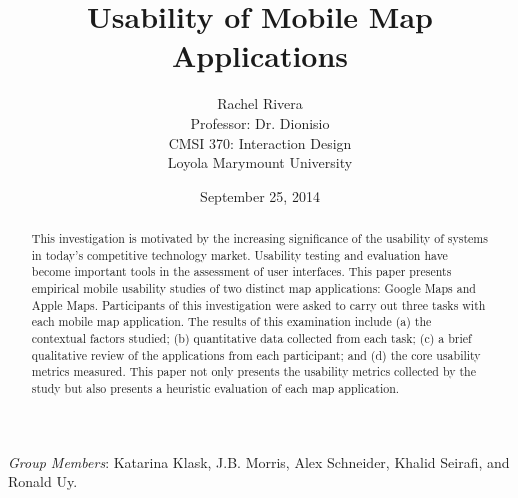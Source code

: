 \documentclass[a4paper; 11pt]{article}
\begin{document}
\title{Usability of Mobile Map Applications}

\author{Rachel Rivera\\
Professor: Dr. Dionisio\\
CMSI 370: Interaction Design\\
  Loyola Marymount University}

\date{September 25, 2014}


\renewcommand{\thefootnote}{\fnsymbol{footnote}}




\maketitle

\vspace{-.2in}
\begin{center}
\begin{abstract}
\noindent This investigation is motivated by the increasing significance of the usability of systems in today's competitive technology market. Usability testing and evaluation have become important tools in the assessment of user interfaces. This paper presents empirical mobile usability studies of two distinct map applications: Google Maps and Apple Maps. Participants of this investigation were asked to carry out three tasks with each mobile map application. The results of this examination include (a) the contextual factors studied; (b) quantitative data collected from each task; (c) a brief qualitative review of the applications from each participant; and (d) the core usability metrics measured. This paper not only presents the usability metrics collected by the study but also presents a heuristic evaluation of each map application.
\end{abstract}
\end{center}

\medskip
\medskip


\medskip
\noindent \textit{Group Members}: Katarina Klask, J.B. Morris, Alex Schneider, Khalid Seirafi, and Ronald Uy.

\thispagestyle{empty}

\clearpage

\setcounter{footnote}{0}
\renewcommand{\thefootnote}{\arabic{footnote}}
\setcounter{page}{1}
\end{document}
